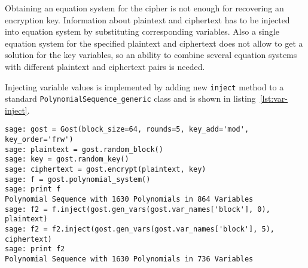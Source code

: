 Obtaining an equation system for the cipher is not enough for recovering an
encryption key. Information about plaintext and ciphertext has to be injected
into equation system by substituting corresponding variables. Also a single
equation system for the specified plaintext and ciphertext does not allow to get a
solution for the key variables, so an ability to combine several equation
systems with different plaintext and ciphertext pairs is needed.

Injecting variable values is implemented by adding new \verb+inject+ method to
a standard \verb+PolynomialSequence_generic+ class and is shown in
listing~\ref{lst:var-inject}.

\begin{lstlisting}[label=lst:var-inject, caption=Injecting variable values into equation system]
sage: gost = Gost(block_size=64, rounds=5, key_add='mod', key_order='frw')             
sage: plaintext = gost.random_block()                                                  
sage: key = gost.random_key()                                                          
sage: ciphertext = gost.encrypt(plaintext, key)                                        
sage: f = gost.polynomial_system()                                                     
sage: print f                                                                        
Polynomial Sequence with 1630 Polynomials in 864 Variables
sage: f2 = f.inject(gost.gen_vars(gost.var_names['block'], 0), plaintext)   
sage: f2 = f2.inject(gost.gen_vars(gost.var_names['block'], 5), ciphertext)
sage: print f2
Polynomial Sequence with 1630 Polynomials in 736 Variables
\end{lstlisting}

